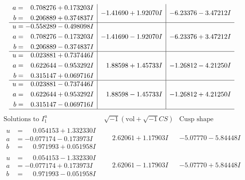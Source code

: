 \documentclass[1p]{elsarticle_modified}
\theoremstyle{definition}
\newcommand{\I}{\sqrt{-1}}
\begin{document}
$$\begin{array}{c|c|c}
\begin{aligned}
a &= \phantom{-}0.708276 + 0.173203 I \\
b &= \phantom{-}0.206889 + 0.374837 I\end{aligned}
 & -1.41690 + 1.92070 I & -6.23376 - 3.47212 I \\ \hline\begin{aligned}
u &= -0.558289 - 0.498098 I \\
a &= \phantom{-}0.708276 - 0.173203 I \\
b &= \phantom{-}0.206889 - 0.374837 I\end{aligned}
 & -1.41690 - 1.92070 I & -6.23376 + 3.47212 I \\ \hline\begin{aligned}
u &= \phantom{-}0.023881 + 0.737446 I \\
a &= \phantom{-}0.622644 - 0.953292 I \\
b &= \phantom{-}0.315147 + 0.069716 I\end{aligned}
 & \phantom{-}1.88598 + 1.45733 I & -1.26812 - 4.21250 I \\ \hline\begin{aligned}
u &= \phantom{-}0.023881 - 0.737446 I \\
a &= \phantom{-}0.622644 + 0.953292 I \\
b &= \phantom{-}0.315147 - 0.069716 I\end{aligned}
 & \phantom{-}1.88598 - 1.45733 I & -1.26812 + 4.21250 I\\
 \hline 
 \end{array}$$\newpage$$\begin{array}{c|c|c}  
\text{Solutions to }I^u_{1}& \I (\text{vol} + \sqrt{-1}CS) & \text{Cusp shape}\\
 \hline 
\begin{aligned}
u &= \phantom{-}0.054153 + 1.332330 I \\
a &= -0.077174 - 0.173973 I \\
b &= \phantom{-}0.971993 + 0.051958 I\end{aligned}
 & \phantom{-}2.62061 + 1.17903 I & -5.07770 - 5.84448 I \\ \hline\begin{aligned}
u &= \phantom{-}0.054153 - 1.332330 I \\
a &= -0.077174 + 0.173973 I \\
b &= \phantom{-}0.971993 - 0.051958 I\end{aligned}
 & \phantom{-}2.62061 - 1.17903 I & -5.07770 + 5.84448 I \\ \hline\begin{aligned}

\end{aligned}
\end{array}$$
\end{document}
